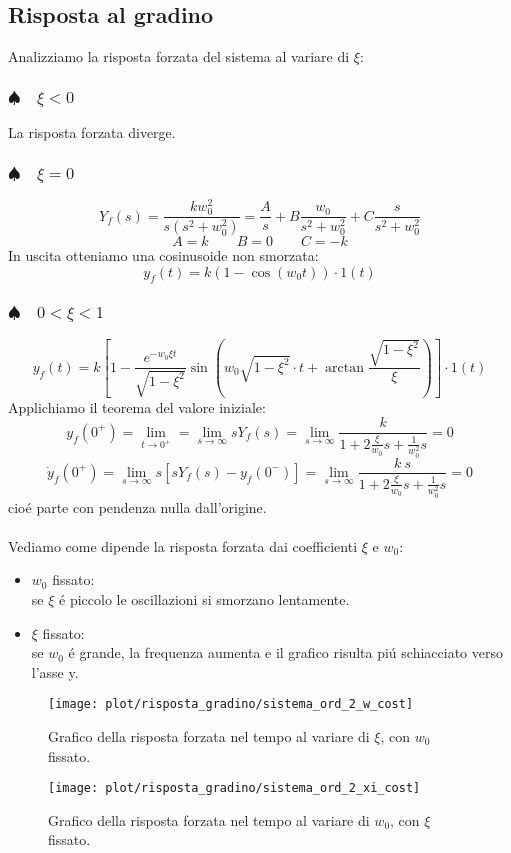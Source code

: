 \documentclass[../main.tex]{subfiles}
\begin{document}
	\subsection{Risposta al gradino}
	Analizziamo la risposta forzata del sistema al variare di $ \xi $:
	\subsubsection{$ \spadesuit \quad \xi < 0 $}
	La risposta forzata diverge.
	\subsubsection{$ \spadesuit \quad \xi = 0 $}
	\[ Y_f(s) = \frac{kw_0^2}{s(s^2+w_0^2)} = \frac{A}{s} + B\frac{w_0}{s^2+w_0^2} + C\frac{s}{s^2+w_0^2} \]
	\[ A = k \qquad B = 0 \qquad C = -k \]
	In uscita otteniamo una cosinusoide non smorzata:
	\[ y_f(t) = k(1-\cos(w_0t)) \cdot 1(t) \]
	\subsubsection{$ \spadesuit \quad 0 < \xi < 1 $}
	\[ y_f(t) = k \left[ 1 - \frac{e^{-w_0\xi t}}{\sqrt{1-\xi^2}} \sin\left( w_0 \sqrt{1-\xi^2} \cdot t + \arctan \frac{\sqrt{1-\xi^2}}{\xi} \right) \right] \cdot 1(t) \]
	Applichiamo il teorema del valore iniziale:
	\[ y_f(0^+) = \lim_{t \to 0^+} = \lim_{s \to \infty} s Y_f(s) = \lim_{s \to \infty} \frac{k}{1+2\frac{\xi}{w_0}s+\frac{1}{w_0^2}s} = 0 \]
	\[ \dot y_f(0^+) = \lim_{s \to \infty} s \left[ sY_f(s) - y_f(0^-) \right] = \lim_{s \to \infty} \frac{k\ s}{1+2\frac{\xi}{w_0}s+\frac{1}{w_0^2}s} = 0 \]
	cio\'e parte con pendenza nulla dall'origine.\\
	\smallskip\\
	Vediamo come dipende la risposta forzata dai coefficienti $ \xi $ e $ w_0 $:
	\begin{itemize}
		\item $ w_0 $ fissato:\\
		se $ \xi $ \'e piccolo le oscillazioni si smorzano lentamente.
		\item $ \xi $ fissato:\\
		se $ w_0 $ \'e grande, la frequenza aumenta e il grafico risulta pi\'u schiacciato verso l'asse y.
	\end{itemize}
	\begin{figure}[H]
		\centering
		\texttt{[image: plot/risposta\_gradino/sistema\_ord\_2\_w\_cost]}
		\caption{Grafico della risposta forzata nel tempo al variare di $ \xi $, con $ w_0 $ fissato.}
	\end{figure} 
	\begin{figure}[H]
		\centering
		\texttt{[image: plot/risposta\_gradino/sistema\_ord\_2\_xi\_cost]}
		\caption{Grafico della risposta forzata nel tempo al variare di $ w_0 $, con $ \xi $ fissato.}
	\end{figure}
\end{document}
